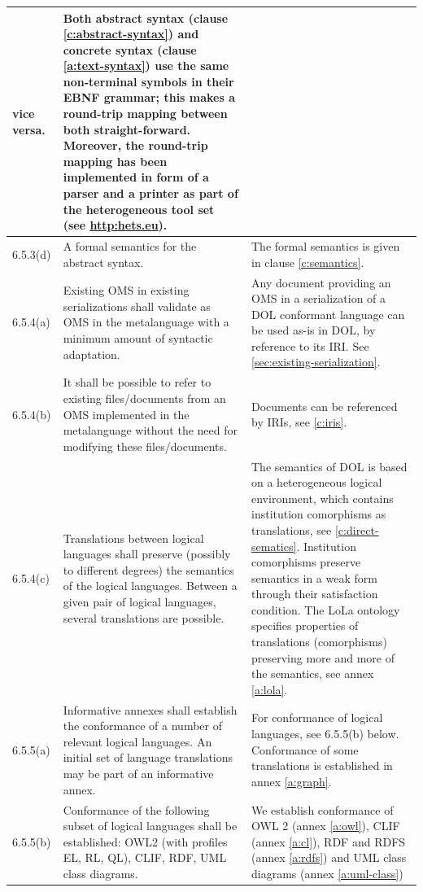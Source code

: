 \documentclass[10pt,fleqn,%
\ifpretendfinal
final%
\else
draft%
\fi,
]{scrreprt}
\begin{document}
\begin{center}
\begin{longtable}{|p{}|p{}|p{}|}
vice versa.	&
Both abstract syntax (clause \ref{c:abstract-syntax}) and concrete syntax (clause 
\ref{a:text-syntax}) use the same non-terminal symbols
in their EBNF grammar; this makes a round-trip mapping between both straight-forward. Moreover, the 
round-trip mapping has been implemented in form of a parser and a printer as part of the 
heterogeneous tool set (see \url{http:hets.eu}).
   \\ \hline
%
6.5.3(d)& 
A formal semantics for the abstract syntax.	&
The formal semantics is given in clause \ref{c:semantics}.
   \\ \hline
%
%
6.5.4(a)& 
Existing OMS in existing serializations shall validate as OMS in the metalanguage with a minimum
amount of syntactic adaptation.	& 
Any document providing an OMS in a serialization of a DOL conformant
language can be used as-is in DOL, by reference to its IRI.
See \ref{sec:existing-serialization}.
   \\ \hline
%
6.5.4(b)& 
It shall be possible to refer to existing files/documents from an OMS implemented in the
metalanguage without the need for modifying these files/documents.	&
Documents can be referenced by IRIs, see \ref{c:iris}.
   \\ \hline
%
6.5.4(c)& 
Translations between logical languages shall preserve (possibly to different degrees) the semantics
of the logical languages. Between a given pair of logical languages, several translations are
possible.	&
The semantics of DOL is based on a heterogeneous logical
environment, which contains institution comorphisms as translations, see \ref{c:direct-sematics}. 
Institution comorphisms preserve semantics
in a weak form through their satisfaction condition. The LoLa ontology specifies properties of 
translations (comorphisms) preserving more and more of the semantics, see annex 
\ref{a:lola}.
   \\ \hline
%
6.5.5(a)& 
Informative annexes shall establish the conformance of a number of relevant logical languages. An
initial set of language translations may be part of an informative annex.	&
For conformance of logical languages, see 6.5.5(b) below.
Conformance of some translations is established in annex \ref{a:graph}.
   \\ \hline
%
6.5.5(b)& 
Conformance of the following subset of logical languages  shall be established: OWL2 (with profiles
EL, RL, QL), CLIF, RDF, UML class diagrams.
	&
We establish conformance of OWL 2 (annex \ref{a:owl}), CLIF (annex \ref{a:cl}), RDF and RDFS (annex \ref{a:rdfs}) and UML class diagrams (annex \ref{a:uml-class}) 

\end{longtable}
\end{center}
\end{document}
